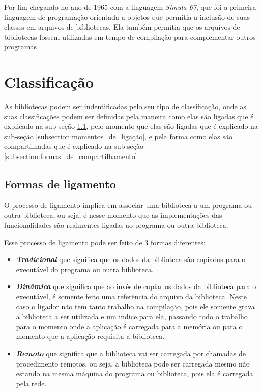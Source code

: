 Por fim chegando no ano de 1965 com a linguagem \emph{Simula 67}, que foi a primeira linguagem
de programação orientada a objetos que permitia a inclusão de suas classes em arquivos de bibliotecas.
Ela também permitia que os arquivos de bibliotecas fossem utilizadas em tempo de compilação para 
complementar outros programas [].

\section{Classificação}
\label{section:classificação_biblioteca}

As bibliotecas podem ser indentificadas pelo seu tipo de classificação, onde as suas classificações 
podem ser definidas pela maneira como elas são ligadas que é explicado na sub-seção 
\ref{subsection:formas_de_ligamento}, pelo momento que elas são ligadas que é explicado na sub-seção 
\ref{subsection:momentos_de_ligação}, e pela forma como elas são compartilhadas que é explicado na
sub-seção \ref{subsection:formas_de_compartilhamento}.

\subsection{Formas de ligamento}
\label{subsection:formas_de_ligamento}

O processo de ligamento implica em associar uma biblioteca a um programa ou outra biblioteca, ou seja,
é nesse momento que as implementações das funcionalidades são realmentes ligadas ao programa ou
outra biblioteca. 

Esse processo de ligamento pode ser feito de 3 formas diferentes:

\begin{itemize}

 \item \emph{\textbf{Tradicional}} que significa que os dados da biblioteca são copiados para o executável do programa
 ou outra biblioteca.
 
 \item \emph{\textbf{Dinâmica}} que significa que ao invés de copiar os dados da biblioteca para o executável, é 
 somente feito uma referência do arquivo da biblioteca. Neste caso o ligador não tem tanto 
 trabalho na compilação, pois ele somente grava a biblioteca a ser utilizada e um indice para 
 ela, passando todo o trabalho para o momento onde a aplicação é carregada para a memória ou para 
 o momento que a aplicação requisita a biblioteca.
 
 \item \emph{\textbf{Remoto}} que significa que a biblioteca vai ser carregada por chamadas de procedimento remotos, 
 ou seja, a biblioteca pode ser carregada mesmo não estando na mesma máquina do programa ou 
 biblioteca, pois ela é carregada pela rede.
 
\end{itemize}

